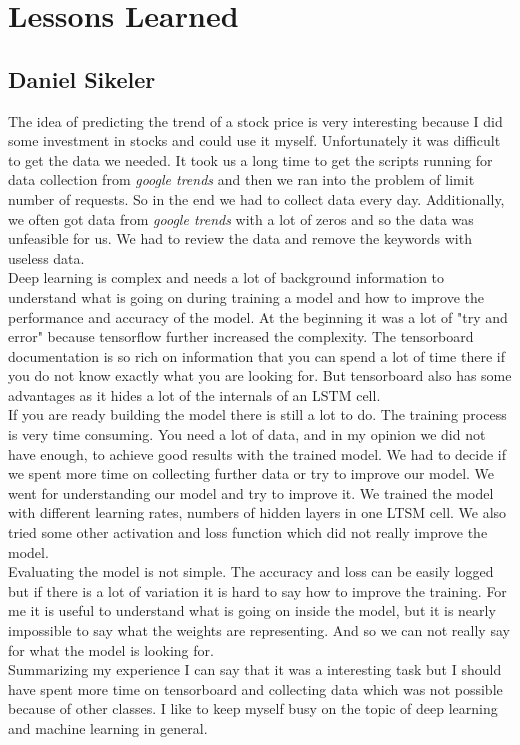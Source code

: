 \section{Lessons Learned}
\label{sec:lessonslearned}

\subsection{Daniel Sikeler}
\label{sec:llDS}
The idea of predicting the trend of a stock price is very interesting because I did some investment in stocks and could use it myself. Unfortunately it was difficult to get the data we needed. It took us a long time to get the scripts running for data collection from \textit{google trends} and then we ran into the problem of limit number of requests. So in the end we had to collect data every day. Additionally, we often got data from \textit{google trends} with a lot of zeros and so the data was unfeasible for us. We had to review the data and remove the keywords with useless data.\\
Deep learning is complex and needs a lot of background information to understand what is going on during training a model and how to improve the performance and accuracy of the model. At the beginning it was a lot of "try and error" because tensorflow further increased the complexity. The tensorboard documentation is so rich on information that you can spend a lot of time there if you do not know exactly what you are looking for. But tensorboard also has some advantages as it hides a lot of the internals of an LSTM cell.\\
If you are ready building the model there is still a lot to do. The training process is very time consuming. You need a lot of data, and in my opinion we did not have enough, to achieve good results with the trained model. We had to decide if we spent more time on collecting further data or try to improve our model. We went for understanding our model and try to improve it. We trained the model with different learning rates, numbers of hidden layers in one LTSM cell. We also tried some other activation and loss function which did not really improve the model.\\
Evaluating the model is not simple. The accuracy and loss can be easily logged but if there is a lot of variation it is hard to say how to improve the training. For me it is useful to understand what is going on inside the model, but it is nearly impossible to say what the weights are representing. And so we can not really say for what the model is looking for.\\
Summarizing my experience I can say that it was a interesting task but I should have spent more time on tensorboard and collecting data which was not possible because of other classes. I like to keep myself busy on the topic of deep learning and machine learning in general. 

